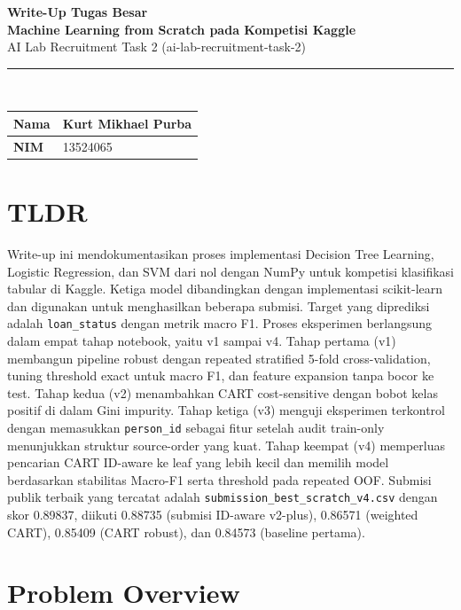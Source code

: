 \documentclass[10pt,a4paper]{article}
\begin{document}
\sloppy

\begin{center}
  {\Large\bfseries Write-Up Tugas Besar}\\[0.3em]
  {\Large\bfseries Machine Learning from Scratch pada Kompetisi Kaggle}\\[0.2em]
  {\normalsize AI Lab Recruitment Task 2 (ai-lab-recruitment-task-2)}\\[0.5em]
  \rule{0.85\textwidth}{0.6pt}\\[0.6em]
  \begin{tabularx}{0.6\textwidth}{|l|X|}
    \hline
    \textbf{Nama} & Kurt Mikhael Purba \\
    \hline
    \textbf{NIM} & 13524065 \\
    \hline
  \end{tabularx}
\end{center}

\section{TLDR}

 Write-up ini mendokumentasikan proses implementasi Decision Tree Learning, Logistic Regression, dan SVM dari nol dengan NumPy untuk kompetisi klasifikasi tabular di Kaggle. Ketiga model dibandingkan dengan implementasi scikit-learn dan digunakan untuk menghasilkan beberapa submisi. Target yang diprediksi adalah \texttt{loan\_status} dengan metrik macro F1. Proses eksperimen berlangsung dalam empat tahap notebook, yaitu v1 sampai v4. Tahap pertama (v1) membangun pipeline robust dengan repeated stratified 5-fold cross-validation, tuning threshold exact untuk macro F1, dan feature expansion tanpa bocor ke test. Tahap kedua (v2) menambahkan CART cost-sensitive dengan bobot kelas positif di dalam Gini impurity. Tahap ketiga (v3) menguji eksperimen terkontrol dengan memasukkan \texttt{person\_id} sebagai fitur setelah audit train-only menunjukkan struktur source-order yang kuat. Tahap keempat (v4) memperluas pencarian CART ID-aware ke leaf yang lebih kecil dan memilih model berdasarkan stabilitas Macro-F1 serta threshold pada repeated OOF. Submisi publik terbaik yang tercatat adalah \texttt{submission\_best\_scratch\_v4.csv} dengan skor 0.89837, diikuti 0.88735 (submisi ID-aware v2-plus), 0.86571 (weighted CART), 0.85409 (CART robust), dan 0.84573 (baseline pertama).

\section{Problem Overview}
\end{document}
